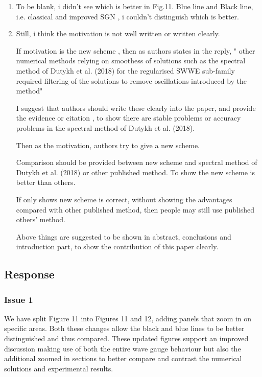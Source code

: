 \documentclass[10pt]{article}
\begin{document}
\begin{enumerate}
	\item To be blank, i didn't see which is better in Fig.11. 
	Blue line and Black line, 
	i.e. classical and improved SGN , 
	i couldn't distinguish which is better.
	\item  Still, i think the motivation is not well written or written clearly.
	
	If motivation is the new scheme ,
	then as authors states in the reply,
	" other numerical methods relying on smoothess of solutions such as the
	spectral method of Dutykh et al. (2018) for the regularised SWWE sub-family required filtering of the solutions to remove oscillations introduced
	by the method"
	
	I suggest that authors should write these clearly into the paper, and provide the evidence or citation , to show there are stable problems or accuracy problems in the
	spectral method of Dutykh et al. (2018).
	
	Then as the motivation, authors try to give a new scheme. 
	
	Comparison should be provided between new scheme and spectral method of Dutykh et al. (2018) or other published method.
	To show the new scheme is better than others.
	
	If only shows new scheme is correct, without showing the advantages compared with other published method, then people may still use published others' method.
	
	Above things are suggested to be shown in abstract, conclusions and introduction part, to show the contribution of this paper clearly.
\end{enumerate}



\subsection{Response}
\subsubsection{Issue 1}
We have split Figure 11 into Figures 11 and 12, adding panels that zoom in on specific areas. Both these changes allow the black and blue lines to be better distinguished and thus compared.
These updated figures support an improved discussion making use of both the entire wave gauge behaviour but also the additional zoomed in sections to better compare and contrast the numerical solutions and experimental results.
\end{document}
